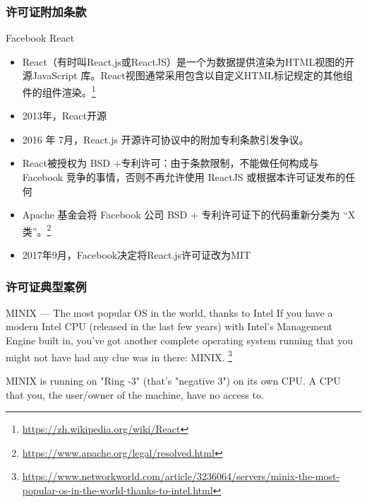 \documentclass{beamer}
\begin{document}
	\begin{frame}
		\frametitle{许可证附加条款}
		\begin{block}
			{Facebook React}
			\begin{itemize}
				\item React（有时叫React.js或ReactJS）是一个为数据提供渲染为HTML视图的开源JavaScript 库。React视图通常采用包含以自定义HTML标记规定的其他组件的组件渲染。\footnote{\url{https://zh.wikipedia.org/wiki/React}}
				\item 2013年，React开源
				\item 2016 年 7月，React.js 开源许可协议中的附加专利条款引发争议。
				\item React被授权为 BSD +专利许可：由于条款限制，不能做任何构成与 Facebook 竞争的事情，否则不再允许使用 ReactJS 或根据本许可证发布的任何 
				\item Apache 基金会将 Facebook 公司 BSD + 专利许可证下的代码重新分类为 “X 类”。\footnote{\url{https://www.apache.org/legal/resolved.html}}
                \item 2017年9月，Facebook决定将React.js许可证改为MIT
			\end{itemize}
		\end{block}

	\end{frame}

    \begin{frame}
        \frametitle{许可证典型案例}
        \begin{block}
            {MINIX — The most popular OS in the world, thanks to Intel}
            If you have a modern Intel CPU (released in the last few years) with Intel's Management Engine built in, you've got another complete operating system running that you might not have had any clue was in there: MINIX.  \footnote{\url{https://www.networkworld.com/article/3236064/servers/minix-the-most-popular-os-in-the-world-thanks-to-intel.html}}

            MINIX is running on "Ring -3" (that's "negative 3") on its own CPU. A CPU that you, the user/owner of the machine, have no access to. 
        \end{block}
    \end{frame}
\end{document}
